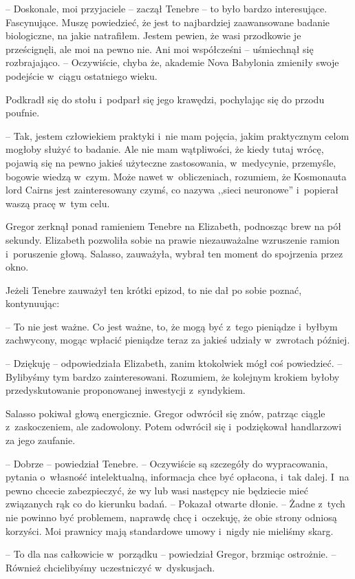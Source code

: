 \documentclass[oneside,polish,12pt,sfheadings]{mwbk}
\begin{document}
-- Doskonale, moi przyjaciele -- zaczął Tenebre -- to było bardzo
interesujące. Fascynujące. Muszę powiedzieć, że jest to najbardziej
zaawansowane badanie biologiczne, na jakie natrafiłem. Jestem pewien, że
wasi przodkowie je prześcignęli, ale moi na pewno nie. Ani moi
współcześni -- uśmiechnął się rozbrajająco. -- Oczywiście, chyba że,
akademie Nova Babylonia zmieniły swoje podejście w~ciągu ostatniego
wieku.

Podkradł się do stołu i~podparł się jego krawędzi, pochylając się do
przodu poufnie.

-- Tak, jestem człowiekiem praktyki i~nie mam pojęcia, jakim praktycznym
celom mogłoby służyć to badanie. Ale nie mam wątpliwości, że kiedy tutaj
wrócę, pojawią się na pewno jakieś użyteczne zastosowania, w~medycynie,
przemyśle, bogowie wiedzą w~czym. Może nawet w~obliczeniach, rozumiem,
że Kosmonauta lord Cairns jest zainteresowany czymś, co nazywa ,,sieci
neuronowe'' i~popierał waszą pracę w~tym celu.

Gregor zerknął ponad ramieniem Tenebre na Elizabeth, podnosząc brew na
pół sekundy. Elizabeth pozwoliła sobie na prawie niezauważalne
wzruszenie ramion i~poruszenie głową. Salasso, zauważyła, wybrał ten
moment do spojrzenia przez okno.

Jeżeli Tenebre zauważył ten krótki epizod, to nie dał po sobie poznać,
kontynuując: 

-- To nie jest ważne. Co jest ważne, to, że mogą być z~tego
pieniądze i~byłbym zachwycony, mogąc wpłacić pieniądze teraz za jakieś
udziały w~zwrotach później.

-- Dziękuję -- odpowiedziała Elizabeth, zanim ktokolwiek mógł coś
powiedzieć. -- Bylibyśmy tym bardzo zainteresowani. Rozumiem, że kolejnym
krokiem byłoby przedyskutowanie proponowanej inwestycji z~syndykiem.

Salasso pokiwał głową energicznie. Gregor odwrócił się znów, patrząc
ciągle z~zaskoczeniem, ale zadowolony. Potem odwrócił się i~podziękował
handlarzowi za jego zaufanie.

-- Dobrze -- powiedział Tenebre. -- Oczywiście są szczegóły do
wypracowania, pytania o~własność intelektualną, informacja chce być
opłacona, i~tak dalej. I~na pewno chcecie zabezpieczyć, że wy lub wasi
następcy nie będziecie mieć związanych rąk co do kierunku badań. --
Pokazał otwarte dłonie. -- Żadne z~tych nie powinno być problemem,
naprawdę chcę i~oczekuję, że obie strony odniosą korzyści. Moi prawnicy
mają standardowe umowy i~nigdy nie mieliśmy skarg.

-- To dla nas całkowicie w~porządku -- powiedział Gregor, brzmiąc
ostrożnie. -- Również chcielibyśmy uczestniczyć w~dyskusjach.
\end{document}
